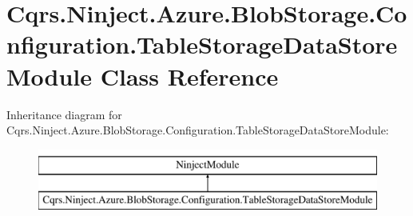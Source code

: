 \hypertarget{classCqrs_1_1Ninject_1_1Azure_1_1BlobStorage_1_1Configuration_1_1TableStorageDataStoreModule}{}\section{Cqrs.\+Ninject.\+Azure.\+Blob\+Storage.\+Configuration.\+Table\+Storage\+Data\+Store\+Module Class Reference}
\label{classCqrs_1_1Ninject_1_1Azure_1_1BlobStorage_1_1Configuration_1_1TableStorageDataStoreModule}
Inheritance diagram for Cqrs.\+Ninject.\+Azure.\+Blob\+Storage.\+Configuration.\+Table\+Storage\+Data\+Store\+Module\+:\begin{figure}[H]
\begin{center}
\leavevmode
\includegraphics[height=2.000000cm]{classCqrs_1_1Ninject_1_1Azure_1_1BlobStorage_1_1Configuration_1_1TableStorageDataStoreModule}
\end{center}
\end{figure}

